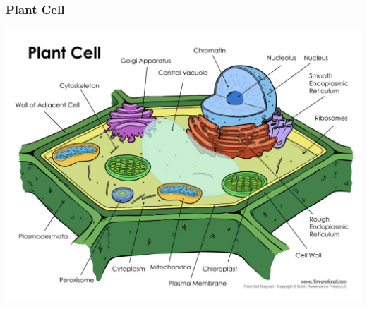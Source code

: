 \documentclass{beamer}
\begin{document}
\begin{frame}
	\frametitle{Plant Cell}
	\centering	\includegraphics[keepaspectratio, width  =1\textwidth]{img/plantCell}\\
\end{frame}
\end{document}
